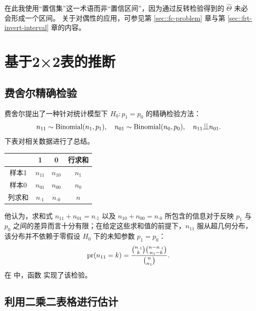 在此我使用“置信集”这一术语而非“置信区间”，因为通过反转检验得到的 $ \hat\Theta$ 未必会形成一个区间。  
关于对偶性的应用，可参见第 \ref{sec::fc-problem} 章与第 \ref{sec::frt-invert-interval} 章的内容。 



\section{基于2×2表的推断}



\subsection{费舍尔精确检验}
\label{sec::fisher-exact-test}

费舍尔提出了一种针对统计模型下 $H_0: p_1 = p_0$ 的精确检验方法：
$$
n_{11} \sim \text{Binomial}(n_1, p_1),\quad
n_{01} \sim \text{Binomial}(n_0, p_0),\quad 
n_{11} \ind n_{01}.
$$
下表对相关数据进行了总结。

\begin{center}
\begin{tabular}{cccc}
\hline 
 & 1 & 0 & 行求和 \\
 \hline 
样本1 & $n_{11}$ & $n_{10}$ & $n_1$ \\
样本0 & $n_{01}$ & $n_{00}$ & $n_0$ \\
列求和 & $n_{\cdot 1}$ & $n_{\cdot 0}$ & $n$ \\
\hline 
\end{tabular}
\end{center}





他认为，求和式 $n_{11}  + n_{01}  =  n_{\cdot 1}$ 以及 $n_{10}  + n_{00}  =  n_{\cdot 0}$ 所包含的信息对于反映 $p_1$ 与 $p_0$ 之间的差异而言十分有限；在给定这些求和值的前提下，$n_{11}$ 服从超几何分布，该分布并不依赖于零假设 $H_0$ 下的未知参数 $p_1=p_0$：
$$
\textup{pr}(n_{11} = k )  = \frac{  \binom{ n_{\cdot 1} }{  k }  \binom{  n -  n_{\cdot 1} }{  n_1 - k   }  }{  \binom{  n }{ n_1 }  }.
$$
在  中，函数  实现了该检验。 



\subsection{利用二乘二表格进行估计}\label{section::asymptotic-inference-2x2}


